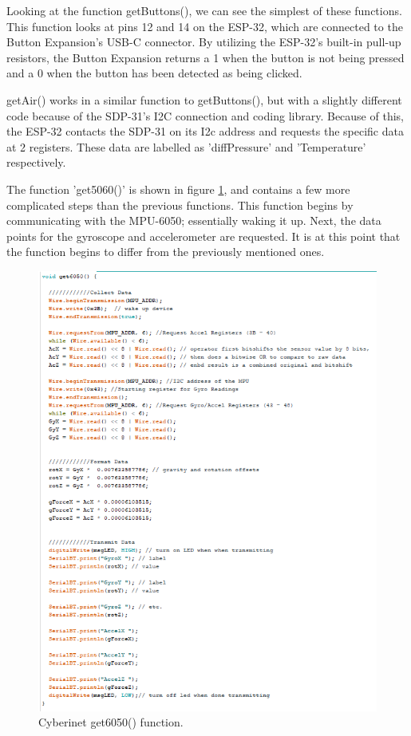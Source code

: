 Looking at the function getButtons(), we can see the simplest of these functions. This function looks at pins 12 and 14 on the ESP-32, which are connected to the Button Expansion's USB-C connector. By utilizing the ESP-32's built-in pull-up resistors, the Button Expansion returns a 1 when the button is not being pressed and a 0 when the button has been detected as being clicked.

getAir() works in a similar function to getButtons(), but with a slightly different code because of the SDP-31's I2C connection and coding library. Because of this, the ESP-32 contacts the SDP-31 on its I2c address and requests the specific data at 2 registers. These data are labelled as 'diffPressure' and 'Temperature' respectively. 

The function 'get5060()' is shown in figure \ref{fig:get6050}, and contains a few more complicated steps than the previous functions. This function begins by communicating with the MPU-6050; essentially waking it up. Next, the data points for the gyroscope and accelerometer are requested. It is at this point that the function begins to differ from the previously mentioned ones.

\begin{center}
    \begin{figure}
        \centering
        \includegraphics[scale=1.5]{diagrams/maxPatches/get6050.png}
        \caption{Cyberinet get6050() function.}
        \label{fig:get6050}
    \end{figure}
\end{center}

